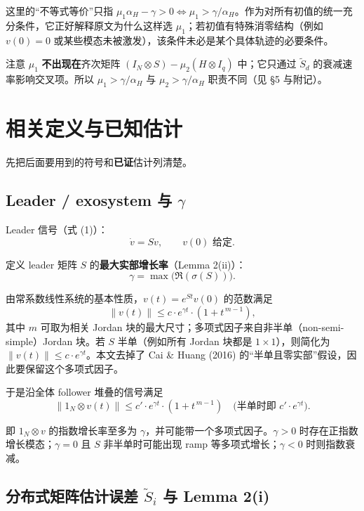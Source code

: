 \documentclass[UTF8]{ctexart}
\begin{document}
这里的“不等式等价”只指 $\mu_1 \alpha_H - \gamma > 0 \Longleftrightarrow \mu_1 > \gamma/\alpha_H$。作为对所有初值的统一充分条件，它正好解释原文为什么这样选 $\mu_1$；若初值有特殊消零结构（例如 $v(0)=0$ 或某些模态未被激发），该条件未必是某个具体轨迹的必要条件。

注意 $\mu_1$ \textbf{不出现在}齐次矩阵 $(I_N \otimes S) - \mu_2(H \otimes I_q)$ 中；它只通过 $\tilde{S}_d$ 的衰减速率影响交叉项。所以 $\mu_1 > \gamma/\alpha_H$ 与 $\mu_2 > \gamma/\alpha_H$ 职责不同（见 \S 5 与附记）。

\section{相关定义与已知估计}

先把后面要用到的符号和\textbf{已证}估计列清楚。

\subsection{Leader / exosystem 与 $\gamma$}

Leader 信号（式 (1)）：
\[
\dot{v} = S v, \qquad v(0) \text{ 给定}.
\]

定义 leader 矩阵 $S$ 的\textbf{最大实部增长率}（Lemma 2(ii)）：
\[
\gamma = \max\bigl(\Re(\sigma(S))\bigr).
\]

由常系数线性系统的基本性质，$v(t) = e^{St}v(0)$ 的范数满足
\[
\|v(t)\| \le c \cdot e^{\gamma t} \cdot (1+t^{\,m-1}),
\]
其中 $m$ 可取为相关 Jordan 块的最大尺寸；多项式因子来自非半单（non-semi-simple）Jordan 块。若 $S$ 半单（例如所有 Jordan 块都是 $1\times 1$），则简化为 $\|v(t)\| \le c \cdot e^{\gamma t}$。本文去掉了 Cai \& Huang (2016) 的“半单且零实部”假设，因此要保留这个多项式因子。

于是沿全体 follower 堆叠的信号满足
\begin{equation}
\|1_N \otimes v(t)\| \le c' \cdot e^{\gamma t} \cdot (1+t^{\,m-1})
\quad \bigl(\text{半单时即 } c' \cdot e^{\gamma t}\bigr). \tag{v-bound}
\end{equation}

即 $1_N \otimes v$ 的指数增长率至多为 $\gamma$，并可能带一个多项式因子。$\gamma > 0$ 时存在正指数增长模态；$\gamma = 0$ 且 $S$ 非半单时可能出现 ramp 等多项式增长；$\gamma < 0$ 时则指数衰减。

\subsection{分布式矩阵估计误差 $\tilde{S}_i$ 与 Lemma 2(i)}
\end{document}
